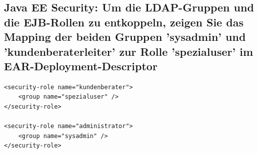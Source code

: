 \subsection{Java EE Security: Um die LDAP-Gruppen und die EJB-Rollen zu entkoppeln, zeigen Sie das Mapping der	beiden Gruppen 'sysadmin' und 'kundenberaterleiter' zur Rolle 'spezialuser' im EAR-Deployment-Descriptor}

\begin{lstlisting}
<security-role name="kundenberater">
	<group name="spezialuser" />
</security-role>

<security-role name="administrator">
	<group name="sysadmin" />
</security-role>
\end{lstlisting}